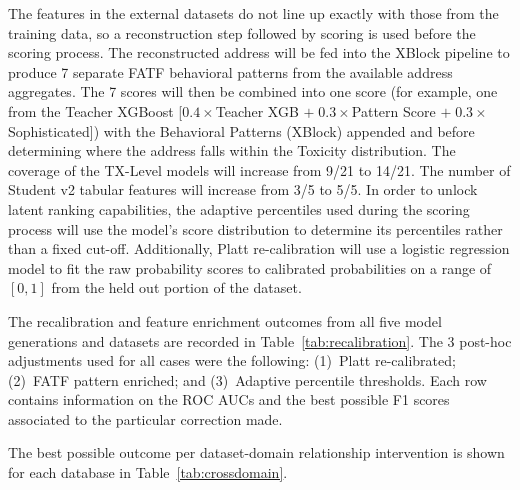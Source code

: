 \documentclass[journal]{IEEEtran}
\begin{document}
The features in the external datasets do not line up exactly with those from the training data, so a reconstruction step followed by scoring is used before the scoring process. The reconstructed address will be fed into the XBlock pipeline to produce 7 separate FATF behavioral patterns from the available address aggregates. The 7 scores will then be combined into one score (for example, one from the Teacher XGBoost [$0.4\times$Teacher XGB $+\;0.3\times$Pattern Score $+\;0.3\times$Sophisticated]) with the Behavioral Patterns (XBlock) appended and before determining where the address falls within the Toxicity distribution. The coverage of the TX-Level models will increase from 9/21 to 14/21. The number of Student v2 tabular features will increase from 3/5 to 5/5. In order to unlock latent ranking capabilities, the adaptive percentiles used during the scoring process will use the model's score distribution to determine its percentiles rather than a fixed cut-off. Additionally, Platt re-calibration will use a logistic regression model to fit the raw probability scores to calibrated probabilities on a range of $[0,1]$ from the held out portion of the dataset.

The recalibration and feature enrichment outcomes from all five model generations and datasets are recorded in Table~\ref{tab:recalibration}. The 3 post-hoc adjustments used for all cases were the following: (1)~Platt re-calibrated; (2)~FATF pattern enriched; and (3)~Adaptive percentile thresholds. Each row contains information on the ROC AUCs and the best possible F1 scores associated to the particular correction made.

The best possible outcome per dataset-domain relationship intervention is shown for each database in Table~\ref{tab:crossdomain}.
\end{document}
